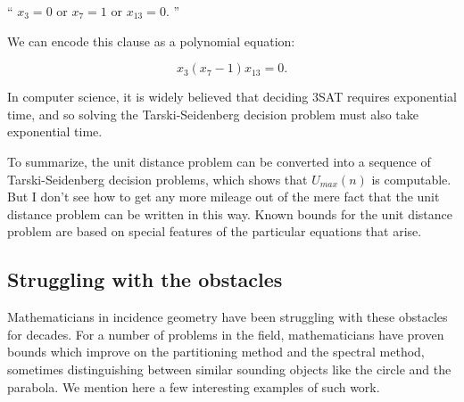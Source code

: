 \documentclass{amsart}
\begin{document}
`` $x_3 = 0$ or $x_7 = 1$ or $x_{13} = 0$. ''

We can encode this clause as a polynomial equation:

$$ x_3 (x_7 - 1) x_{13} = 0. $$

\noindent  In computer science, it is widely believed that deciding 3SAT requires exponential time, and so solving the Tarski-Seidenberg decision problem must also take exponential time.    




To summarize, the unit distance problem can be converted into a sequence of Tarski-Seidenberg decision problems, which shows that $U_{max}(n)$ is computable.  But I don't see how to get any more mileage out of the mere fact that the unit distance problem can be written in this way.  Known bounds for the unit distance problem are based on special features of the particular equations that arise.

\subsection{Struggling with the obstacles}

Mathematicians in incidence geometry have been struggling with these obstacles for decades.  For a number of problems in the field, mathematicians have proven bounds which improve on the partitioning method and the spectral method, sometimes distinguishing between similar sounding objects like the circle and the parabola.  We mention here a few interesting examples of such work.
\end{document}
